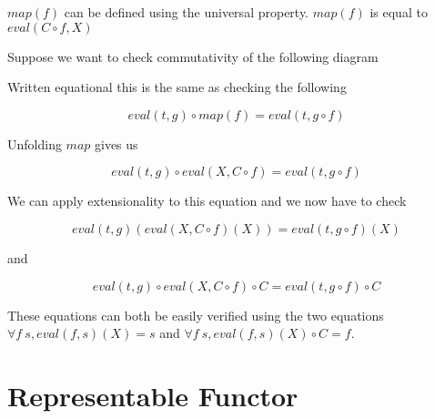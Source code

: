 \documentclass[12pt]{article} %
\theoremstyle{definition}
\theoremstyle{definition}
\theoremstyle{definition}
\theoremstyle{definition}
\begin{document}
$map(f)$ can be defined using the universal property. $map(f)$ is equal to
$eval(C \circ f, X)$

Suppose we want to check commutativity of the following diagram \newline

Written equational this is the same as checking the following

\begin{equation}
  eval(t, g) \circ map(f) = eval(t, g \circ f)
\end{equation}

Unfolding $map$ gives us

\begin{equation}
  eval(t, g) \circ eval(X, C \circ f) = eval(t, g \circ f)
\end{equation}

We can apply extensionality to this equation and we now have to check

\begin{equation}
  eval(t, g) (eval(X, C \circ f)(X)) = eval(t, g \circ f)(X)
\end{equation}

and

\begin{equation}
  eval(t, g) \circ eval(X, C \circ f) \circ C = eval(t, g \circ f) \circ C
\end{equation}

These equations can both be easily verified using the two equations
$\forall f\ s, eval(f, s)(X) = s$ and
$\forall f \ s,eval(f, s)(X) \circ C = f$.


\section{Representable Functor}
\end{document}
